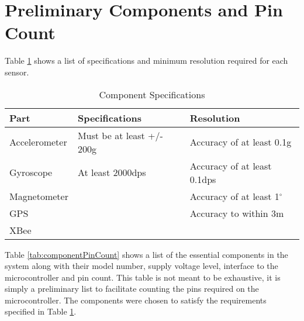 \section{Preliminary Components and Pin Count}

Table \ref{tab:sensorResolution} shows a list of specifications and minimum resolution required for each sensor.

\begin{table}[H]
\setlength{\extrarowheight}{1.5pt}
  \centering
  \caption{Component Specifications}
    \begin{tabular}{|m{1in}|m{2.2in}|m{2.2in}|}
    \hline
     Part  &  Specifications &  Resolution \\
    \hline \hline
    Accelerometer & Must be at least +/- 200g & Accuracy of at least 0.1g \\ \hline
    Gyroscope & At least 2000dps & Accuracy of at least 0.1dps \\ \hline
    Magnetometer & & Accuracy of at least 1$^{\circ}$ \\ \hline
    GPS   &  & Accuracy to within 3m  \\ \hline 
    XBee  & & \\ \hline
    
    \end{tabular}%
  \label{tab:sensorResolution}%
\end{table}%

Table \ref{tab:componentPinCount} shows a list of the essential components in the system along with their model number, supply voltage level, interface to the microcontroller and pin count.  This table is not meant to be exhaustive, it is simply a preliminary list to facilitate counting the pins required on the microcontroller. The components were chosen to satisfy the requirements specified in Table \ref{tab:sensorResolution}.

